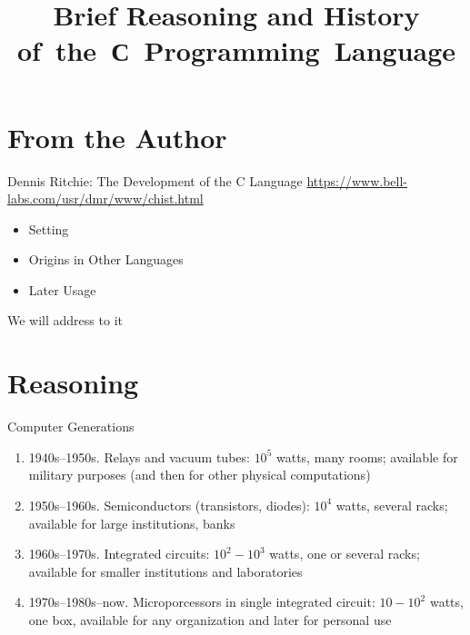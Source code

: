 \documentclass[xetex,aspectratio=149]{beamer}
\title{Brief Reasoning and History of~the~С~Programming~Language}
\begin{document}
\hello

\section{From the Author}

\begin{frame}{Dennis Ritchie: The Development of the C Language}
	\url{https://www.bell-labs.com/usr/dmr/www/chist.html}
	\begin{itemize}
		\item Setting
		\item Origins in Other Languages
		\item Later Usage
	\end{itemize}
	We will address to it
\end{frame}

\section{Reasoning}

\begin{frame}{Computer Generations}
	\begin{enumerate}
		\item 1940s--1950s. Relays and vacuum tubes: $10^5$ watts, many rooms; available for military purposes (and then for other physical computations)
		\item 1950s--1960s. Semiconductors (transistors, diodes): $10^4$ watts, several racks; available for large institutions, banks
		\item 1960s--1970s. Integrated circuits: $10^2-10^3$ watts, one or several racks; available for smaller institutions and laboratories
		\item 1970s--1980s--now. Microporcessors in single integrated circuit: $10-10^2$ watts,
		one box, available for any organization and later for personal use
	\end{enumerate}
\end{frame}
\end{document}
